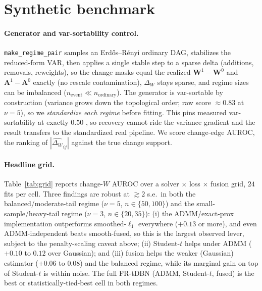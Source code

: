 \documentclass{article}
\newcommand{\W}{\bm{W}}
\newcommand{\A}{\bm{A}}
\newcommand{\Wd}{\Delta_{\!W}}
\begin{document}
\section{Synthetic benchmark}
\label{sec:synthetic}

\paragraph{Generator and var-sortability control.}
\texttt{make\_regime\_pair} samples an Erd\H{o}s--R\'enyi ordinary DAG, stabilizes the
reduced-form VAR, then applies a single stable step to a sparse delta
(additions, removals, reweights), so the change masks equal the realized $\W^1-\W^0$
and $\A^1-\A^0$ exactly (no rescale contamination), $\Wd$ stays sparse, and regime
sizes can be imbalanced ($n_{\text{event}}\ll n_{\text{ordinary}}$). The generator is
var-sortable by construction (variance grows down the topological order; raw score
$\approx 0.83$ at $\nu{=}5$), so we \emph{standardize each regime} before fitting.
This pins measured var-sortability at exactly $0.50$
\citep{reisach2021varsortability}, so recovery cannot ride the variance gradient and the
result transfers to the standardized real pipeline. We score change-edge AUROC, the
ranking of $|\widehat{\Wd}_{ij}|$ against the true change support.

\paragraph{Headline grid.}
Table~\ref{tab:grid} reports change-$W$ AUROC over a solver $\times$ loss $\times$
fusion grid, $24$ fits per cell. Three findings are robust at $\gtrsim 2$ s.e.\ in
both the balanced/moderate-tail regime ($\nu{=}5$, $n\in\{50,100\}$) and the
small-sample/heavy-tail regime ($\nu{=}3$, $n\in\{20,35\}$):
(i) the ADMM/exact-prox implementation outperforms smoothed-$\ell_1$ everywhere
($+0.13$ or more), and even ADMM-independent beats smooth-fused, so this is the
largest observed lever, subject to the penalty-scaling caveat above; (ii) Student-$t$
helps under ADMM ($+0.10$ to $0.12$ over
Gaussian); and (iii) fusion helps the weaker (Gaussian) estimator
($+0.06$ to $0.08$) and the balanced regime, while its marginal gain on top of
Student-$t$ is within noise. The full FR-tDBN (ADMM, Student-$t$, fused) is the
best or statistically-tied-best cell in both regimes.
\end{document}
